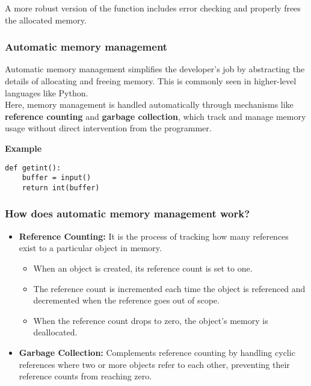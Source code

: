 \documentclass[12pt]{article}
\begin{document}
A more robust version of the function includes error checking and properly frees the allocated memory.


\subsubsection{Automatic memory management}
Automatic memory management simplifies the developer's job by abstracting the details of allocating and freeing memory. This is commonly seen in higher-level languages like Python.\\
Here, memory management is handled automatically through mechanisms like \textbf{reference counting} and \textbf{garbage collection}, which track and manage memory usage without direct intervention from the programmer.


\textbf{Example}
\begin{lstlisting}
def getint():
    buffer = input()
    return int(buffer)
\end{lstlisting}


\subsubsection{How does automatic memory management work?}

\begin{itemize}
    \item \textbf{Reference Counting:} It is the process of tracking how many references exist to a particular object in memory.
    \begin{itemize}
        \item When an object is created, its reference count is set to one.
        \item The reference count is incremented each time the object is referenced and decremented when the reference goes out of scope.
        \item When the reference count drops to zero, the object's memory is deallocated.
    \end{itemize}
    \item \textbf{Garbage Collection:} Complements reference counting by handling cyclic references where two or more objects refer to each other, preventing their reference counts from reaching zero.
\end{itemize}


\end{document}
